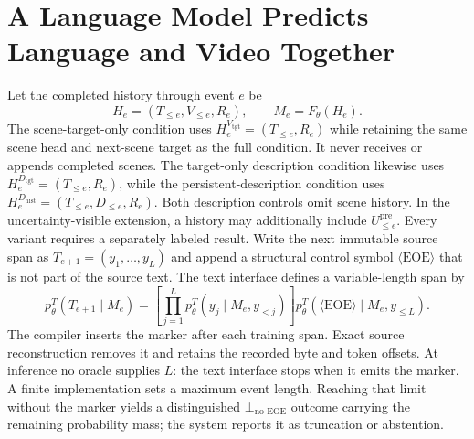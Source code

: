 \documentclass[11pt]{article}
\begin{document}
\section{A Language Model Predicts Language and Video Together}
\label{sec:model}

Let the completed history through event $e$ be
\begin{equation}
  H_e=(T_{\le e},V_{\le e},R_e), \qquad M_e=F_\theta(H_e).
  \label{eq:history}
\end{equation}
The scene-target-only condition uses $H_e^{V_{\mathrm{tgt}}}=(T_{\le e},R_e)$ while retaining the same scene head and next-scene target as the full condition. It never receives or appends completed scenes. The target-only description condition likewise uses $H_e^{D_{\mathrm{tgt}}}=(T_{\le e},R_e)$, while the persistent-description condition uses $H_e^{D_{\mathrm{hist}}}=(T_{\le e},D_{\le e},R_e)$. Both description controls omit scene history. In the uncertainty-visible extension, a history may additionally include $U_{\le e}^{\mathrm{pre}}$. Every variant requires a separately labeled result.
Write the next immutable source span as $T_{e+1}=(y_1,\ldots,y_L)$ and append a structural control symbol $\langle\mathrm{EOE}\rangle$ that is not part of the source text. The text interface defines a variable-length span by
\begin{equation}
  p_\theta^T(T_{e+1}\mid M_e)
  =\left[\prod_{j=1}^{L}p_\theta^T(y_j\mid M_e,y_{<j})\right]
  p_\theta^T(\langle\mathrm{EOE}\rangle\mid M_e,y_{\le L}).
  \label{eq:text-span}
\end{equation}
The compiler inserts the marker after each training span. Exact source reconstruction removes it and retains the recorded byte and token offsets. At inference no oracle supplies $L$: the text interface stops when it emits the marker. A finite implementation sets a maximum event length. Reaching that limit without the marker yields a distinguished $\bot_{\mathrm{no\text{-}EOE}}$ outcome carrying the remaining probability mass; the system reports it as truncation or abstention.
\end{document}
